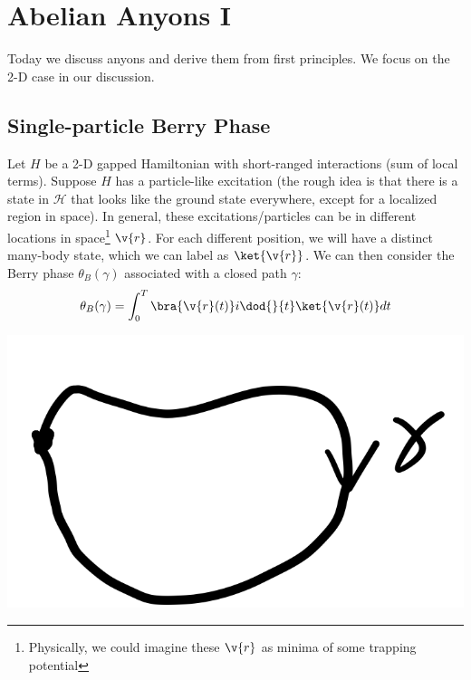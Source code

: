 \section{Abelian Anyons I}

Today we discuss anyons and derive them from first principles. We focus on the 2-D case in our discussion.

\subsection{Single-particle Berry Phase}
Let $H$ be a 2-D gapped Hamiltonian with short-ranged interactions (sum of local terms). Suppose $H$ has a particle-like excitation (the rough idea is that there is a state in $\mathcal{H}$ that looks like the ground state everywhere, except for a localized region in space). In general, these excitations/particles can be in different locations in space\footnote{Physically, we could imagine these $\v{r}$ as minima of some trapping potential} $\v{r}$. For each different position, we will have a distinct many-body state, which we can label as $\ket{\v{r}}$. We can then consider the Berry phase $\theta_B(\gamma)$ associated with a closed path $\gamma$:
\begin{equation}
    \theta_B(\gamma) = \int_0^T \bra{\v{r}(t)}i\dod{}{t}\ket{\v{r}(t)}dt
\end{equation}

\begin{center}
    \includegraphics[scale=0.3]{Lectures/Images/lec4-path.png}
\end{center}

